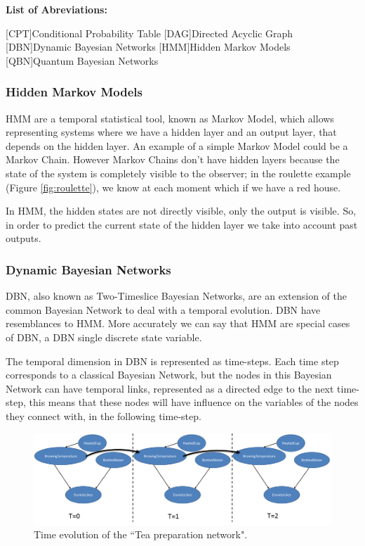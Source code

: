 \documentclass{llncs} %
\begin{document}
{\bf List of Abreviations:}
\begin{acronym}
 

[CPT]{Conditional Probability Table}
[DAG]{Directed Acyclic Graph} 
[DBN]{Dynamic Bayesian Networks}
[HMM]{Hidden Markov Models}
[QBN]{Quantum Bayesian Networks} 
\end{acronym}


\subsubsection{Hidden Markov Models}
\ac{HMM} are a temporal statistical tool, known as Markov Model, which allows representing systems where we have a hidden layer and an output layer, that depends on the hidden layer\cite{eemcs5901}\cite{Norvig2003}. An example of a simple Markov Model could be a Markov Chain. However Markov Chains don’t have hidden layers because the state of the system is completely visible to the observer; in the roulette example (Figure \ref{fig:roulette}), we know at each moment which if we have a red house. 

In \ac{HMM}, the hidden states are not directly visible, only the output is visible\cite{citeulike:405907}. So, in order to predict the current state of the hidden layer we take into account past outputs. 

\subsubsection{Dynamic Bayesian Networks}
\ac{DBN}, also known as Two-Timeslice Bayesian Networks, are an extension of the common Bayesian Network to deal with a temporal evolution\cite{eemcs5901}. \ac{DBN} have resemblances to \ac{HMM}. More accurately we can say that \ac{HMM} are special cases of \ac{DBN}, a \ac{DBN} single discrete state variable\cite{Norvig2003}. 

The temporal dimension in \ac{DBN} is represented as time-steps. Each time step corresponds to a classical Bayesian Network, but the nodes in this Bayesian Network can have temporal links, represented as a directed edge to the next time-step, this means that these nodes will have influence on the variables of the nodes they connect with, in the following time-step.

\begin{figure}[h]
\centering 

\includegraphics[scale=0.48]{Overview/Figures/TeaPreparationNetworkDBN.png}
\caption{Time evolution of the ``Tea preparation network".}
\label{fig:tea_networkdbn}
\end{figure}
\end{document}
